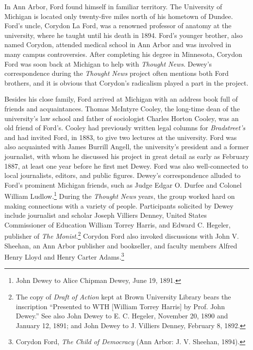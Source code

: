 \documentclass[openany,nobib]{tufte-book}
\begin{document}
In Ann Arbor, Ford found himself in familiar territory. The University
of Michigan is located only twenty-five miles north of his hometown of
Dundee. Ford's uncle, Corydon La Ford, was a renowned professor of
anatomy at the university, where he taught until his death in 1894.
Ford's younger brother, also named Corydon, attended medical school in
Ann Arbor and was involved in many campus controversies. After
completing his degree in Minnesota, Corydon Ford was soon back at
Michigan to help with \emph{Thought News}. Dewey's correspondence during
the \emph{Thought News} project often mentions both Ford brothers, and
it is obvious that Corydon's radicalism played a part in the project.

Besides his close family, Ford arrived at Michigan with an address book
full of friends and acquaintances. Thomas McIntyre Cooley, the long-time
dean of the university's law school and father of sociologist Charles
Horton Cooley, was an old friend of Ford's. Cooley had previously
written legal columns for \emph{Bradstreet's} and had invited Ford, in
1883, to give two lectures at the university. Ford was also acquainted
with James Burrill Angell, the university's president and a former
journalist, with whom he discussed his project in great detail as early
as February 1887, at least one year before he first met Dewey. Ford was
also well-connected to local journalists, editors, and public figures.
Dewey's correspondence alluded to Ford's prominent Michigan friends,
such as Judge Edgar O. Durfee and Colonel William Ludlow.\footnote{John
  Dewey to Alice Chipman Dewey, June 19, 1891.} During the \emph{Thought
News} years, the group worked hard on making connections with a variety
of people. Participants solicited by Dewey include journalist and
scholar Joseph Villiers Denney, United States Commissioner of Education
William Torrey Harris, and Edward C. Hegeler, publisher of \emph{The
Monist}.\footnote{The copy of \emph{Draft of Action} kept at Brown
  University Library bears the inscription ``Presented to WTH {[}William
  Torrey Harris{]} by Prof. John Dewey.'' See also John Dewey to E. C.
  Hegeler, November 20, 1890 and January 12, 1891; and John Dewey to J.
  Villiers Denney, February 8, 1892.} Corydon Ford also invoked
discussions with John V. Sheehan, an Ann Arbor publisher and bookseller,
and faculty members Alfred Henry Lloyd and Henry Carter
Adams.\footnote{Corydon Ford, \emph{The Child of Democracy} (Ann Arbor:
  J. V. Sheehan, 1894).}
\end{document}
